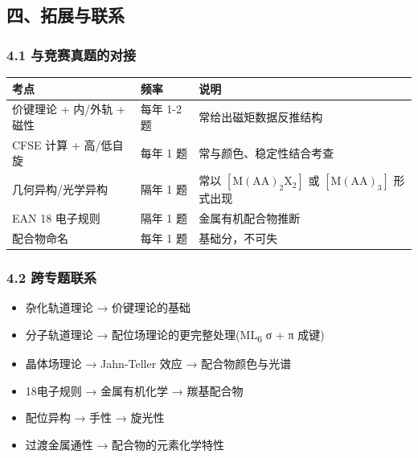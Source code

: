 \subsection{四、拓展与联系}\label{ux56dbux62d3ux5c55ux4e0eux8054ux7cfb}

\subsubsection{4.1 与竞赛真题的对接}\label{ux4e0eux7adeux8d5bux771fux9898ux7684ux5bf9ux63a5}

{\def\LTcaptype{none} %
\begin{longtable}[]{@{}
  >{\raggedright\arraybackslash}p{}
  >{\centering\arraybackslash}p{}
  >{\raggedright\arraybackslash}p{}@{}}
\toprule\noalign{}
\begin{minipage}[b]{\linewidth}\raggedright
考点
\end{minipage} & \begin{minipage}[b]{\linewidth}\centering
频率
\end{minipage} & \begin{minipage}[b]{\linewidth}\raggedright
说明
\end{minipage} \\
\midrule\noalign{}
\endhead
\bottomrule\noalign{}
\endlastfoot
价键理论 + 内/外轨 + 磁性 & 每年 1-2 题 & 常给出磁矩数据反推结构 \\
CFSE 计算 + 高/低自旋 & 每年 1 题 & 常与颜色、稳定性结合考查 \\
几何异构/光学异构 & 隔年 1 题 & 常以 \([\mathrm{M(AA)_2X_2}]\) 或 \([\mathrm{M(AA)_3}]\) 形式出现 \\
EAN 18 电子规则 & 隔年 1 题 & 金属有机配合物推断 \\
配合物命名 & 每年 1 题 & 基础分，不可失 \\
\end{longtable}
}

\subsubsection{4.2 跨专题联系}\label{ux8de8ux4e13ux9898ux8054ux7cfb}

\begin{itemize}
\tightlist
\item
  杂化轨道理论 → 价键理论的基础
\item
  分子轨道理论 → 配位场理论的更完整处理(ML\textsubscript{6} σ + π 成键)
\item
  晶体场理论 → Jahn-Teller 效应 → 配合物颜色与光谱
\item
  18电子规则 → 金属有机化学 → 羰基配合物
\item
  配位异构 → 手性 → 旋光性
\item
  过渡金属通性 → 配合物的元素化学特性
\end{itemize}

